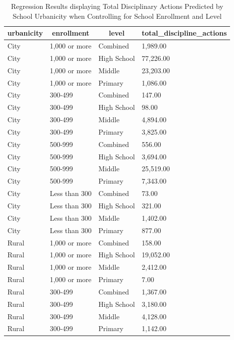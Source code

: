 \documentclass[man]{apa6}
\begin{document}
\begin{table}[tbp]

\begin{center}
\begin{threeparttable}

\caption{\label{tab:model tables}Regression Results displaying Total Disciplinary Actions Predicted by School Urbanicity when Controlling for School Enrollment and Level}

\begin{tabular}{llll}
\toprule
urbanicity & \multicolumn{1}{c}{enrollment} & \multicolumn{1}{c}{level} & \multicolumn{1}{c}{total\_discipline\_actions}\\
\midrule
City & 1,000 or more & Combined & 1,989.00\\
City & 1,000 or more & High School & 77,226.00\\
City & 1,000 or more & Middle & 23,203.00\\
City & 1,000 or more & Primary & 1,086.00\\
City & 300-499 & Combined & 147.00\\
City & 300-499 & High School & 98.00\\
City & 300-499 & Middle & 4,894.00\\
City & 300-499 & Primary & 3,825.00\\
City & 500-999 & Combined & 556.00\\
City & 500-999 & High School & 3,694.00\\
City & 500-999 & Middle & 25,519.00\\
City & 500-999 & Primary & 7,343.00\\
City & Less than 300 & Combined & 73.00\\
City & Less than 300 & High School & 321.00\\
City & Less than 300 & Middle & 1,402.00\\
City & Less than 300 & Primary & 877.00\\
Rural & 1,000 or more & Combined & 158.00\\
Rural & 1,000 or more & High School & 19,052.00\\
Rural & 1,000 or more & Middle & 2,412.00\\
Rural & 1,000 or more & Primary & 7.00\\
Rural & 300-499 & Combined & 1,367.00\\
Rural & 300-499 & High School & 3,180.00\\
Rural & 300-499 & Middle & 4,128.00\\
Rural & 300-499 & Primary & 1,142.00\\

\end{tabular}
\end{threeparttable}
\end{center}
\end{table}
\end{document}
